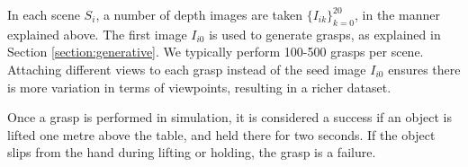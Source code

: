 
In each scene $S_i$, a number of depth images are taken $\{I_{ik}\}_{k=0}^{20}$, in the manner explained above. The first image $I_{i0}$ is used to generate grasps, as explained in Section \ref{section:generative}. We typically perform 100-500 grasps per scene. Attaching different views to each grasp instead of the seed image $I_{i0}$ ensures there is more variation in terms of viewpoints, resulting in a richer dataset.

Once a grasp is performed in simulation, it is considered a success if an object is lifted one metre above the table, and held there for two seconds. If the object slips from the hand during lifting or holding, the grasp is a failure. 

